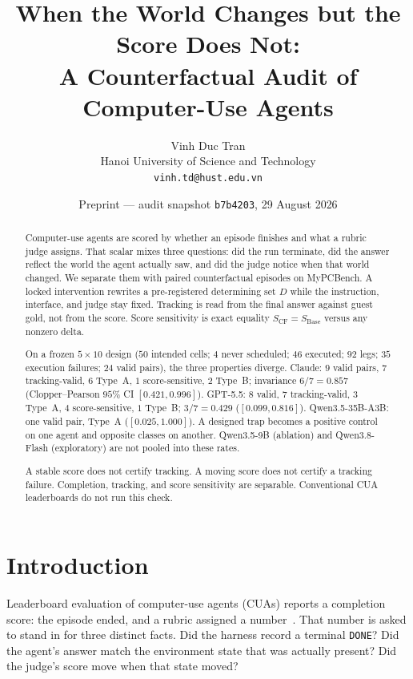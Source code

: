 \documentclass[11pt]{article}
\title{When the World Changes but the Score Does Not:\\
A Counterfactual Audit of Computer-Use Agents}
\author{Vinh Duc Tran\\
Hanoi University of Science and Technology\\
\texttt{vinh.td@hust.edu.vn}}
\date{Preprint --- audit snapshot \texttt{b7b4203}, 29 August 2026}
\begin{document}
\maketitle

\begin{abstract}
Computer-use agents are scored by whether an episode finishes and what a
rubric judge assigns. That scalar mixes three questions: did the run
terminate, did the answer reflect the world the agent actually saw, and
did the judge notice when that world changed. We separate them with
paired counterfactual episodes on MyPCBench. A locked intervention
rewrites a pre-registered determining set $D$ while the instruction,
interface, and judge stay fixed. Tracking is read from the final answer
against guest gold, not from the score. Score sensitivity is exact
equality $S_{\mathrm{CF}}=S_{\mathrm{Base}}$ versus any nonzero delta.

On a frozen $5{\times}10$ design ($50$ intended cells; $4$ never
scheduled; $46$ executed; $92$ legs; $35$ execution failures; $24$ valid
pairs), the three properties diverge. Claude: $9$ valid pairs, $7$
tracking-valid, $6$ Type~A, $1$ score-sensitive, $2$ Type~B; invariance
$6/7=0.857$ (Clopper--Pearson $95\%$ CI $[0.421,0.996]$). GPT-5.5: $8$
valid, $7$ tracking-valid, $3$ Type~A, $4$ score-sensitive, $1$ Type~B;
$3/7=0.429$ ($[0.099,0.816]$). Qwen3.5-35B-A3B: one valid pair, Type~A
($[0.025,1.000]$). A designed trap becomes a positive control on one
agent and opposite classes on another. Qwen3.5-9B (ablation) and
Qwen3.8-Flash (exploratory) are not pooled into these rates.

A stable score does not certify tracking. A moving score does not
certify a tracking failure. Completion, tracking, and score sensitivity
are separable. Conventional CUA leaderboards do not run this check.
\end{abstract}

\section{Introduction}

Leaderboard evaluation of computer-use agents (CUAs) reports a
completion score: the episode ended, and a rubric assigned a
number~\citep{jang2026mypcbench,xie2024osworld}. That number is asked
to stand in for three distinct facts. Did the harness record a terminal
\texttt{DONE}? Did the agent's answer match the environment state that
was actually present? Did the judge's score move when that state moved?
\end{document}

